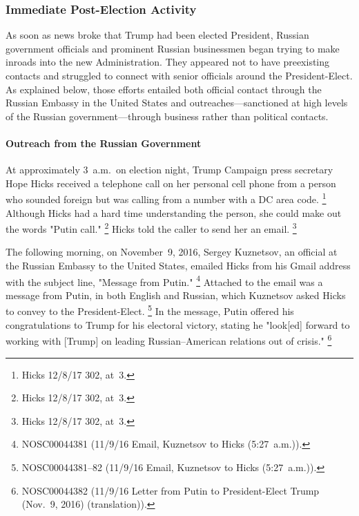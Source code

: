 \subsubsection{Immediate Post-Election Activity}

As soon as news broke that Trump had been elected President, Russian government officials and prominent Russian businessmen began trying to make inroads into the new Administration.
They appeared not to have preexisting contacts and struggled to connect with senior officials around the President-Elect.
As explained below, those efforts entailed both official contact through the Russian Embassy in the United States and outreaches---sanctioned at high levels of the Russian government---through business rather than political contacts.

\paragraph{Outreach from the Russian Government}

At approximately 3~a.m.\ on election night, Trump Campaign press secretary Hope Hicks received a telephone call on her personal cell phone from a person who sounded foreign but was calling from a number with a DC area code.%
\footnote{Hicks 12/8/17 302, at~3.}
Although Hicks had a hard time understanding the person, she could make out the words "Putin call."%
\footnote{Hicks 12/8/17 302, at~3.}
Hicks told the caller to send her an email.%
\footnote{Hicks 12/8/17 302, at~3.}

The following morning, on November~9, 2016, Sergey Kuznetsov, an official at the Russian Embassy to the United States, emailed Hicks from his Gmail address with the subject line, "Message from Putin."%
\footnote{NOSC00044381 (11/9/16 Email, Kuznetsov to Hicks (5:27~a.m.)).}
Attached to the email was a message from Putin, in both English and Russian, which Kuznetsov asked Hicks to convey to the President-Elect.%
\footnote{NOSC00044381--82 (11/9/16 Email, Kuznetsov to Hicks (5:27~a.m.)).}
In the message, Putin offered his congratulations to Trump for his electoral victory, stating he "look[ed] forward to working with [Trump] on leading Russian--American relations out of crisis."%
\footnote{NOSC00044382 (11/9/16 Letter from Putin to President-Elect Trump (Nov.~9, 2016) (translation)).}

